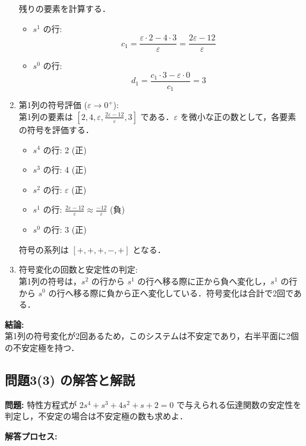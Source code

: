 \documentclass[11pt,a4paper]{ltjsarticle}
\begin{document}
\begin{enumerate}
残りの要素を計算する．
\begin{itemize}
\item $s^1$ の行:
$$c_1 = \frac{\varepsilon \cdot 2 - 4 \cdot 3}{\varepsilon} = \frac{2\varepsilon - 12}{\varepsilon}$$
\item $s^0$ の行:
$$d_1 = \frac{c_1 \cdot 3 - \varepsilon \cdot 0}{c_1} = 3$$
\end{itemize}

\item 第1列の符号評価 ($\varepsilon \to 0^+$):\\
第1列の要素は $[2, 4, \varepsilon, \frac{2\varepsilon-12}{\varepsilon}, 3]$ である．$\varepsilon$ を微小な正の数として，各要素の符号を評価する．
\begin{itemize}
\item $s^4$ の行: 2 (正)
\item $s^3$ の行: 4 (正)
\item $s^2$ の行: $\varepsilon$ (正)
\item $s^1$ の行: $\frac{2\varepsilon-12}{\varepsilon} \approx \frac{-12}{\varepsilon}$ (負)
\item $s^0$ の行: 3 (正)
\end{itemize}
符号の系列は $[+, +, +, -, +]$ となる．

\item 符号変化の回数と安定性の判定:\\
第1列の符号は，$s^2$ の行から $s^1$ の行へ移る際に正から負へ変化し，$s^1$ の行から $s^0$ の行へ移る際に負から正へ変化している．符号変化は合計で2回である．
\end{enumerate}

\textbf{結論:}\\
第1列の符号変化が2回あるため，このシステムは不安定であり，右半平面に2個の不安定極を持つ．

\subsection{問題3(3) の解答と解説}

\textbf{問題:} 特性方程式が $2s^4+s^3+4s^2+s+2=0$ で与えられる伝達関数の安定性を判定し，不安定の場合は不安定極の数も求めよ．

\textbf{解答プロセス:}
\end{document}
